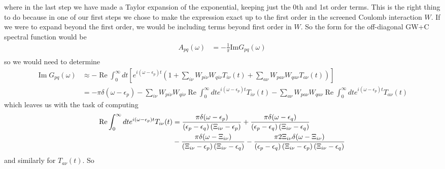 where in the last step we have made a Taylor expansion of the exponential, keeping just the 0th and 1st order terms. This is the right thing to do because in one of our first steps we chose to make the expression exact up to the first order in the screened Coulomb interaction $W$. If we were to expand beyond the first order, we would be including terms beyond first order in $W$.
So the form for the off-diagonal GW+C spectral function would be
\begin{align}
    A_{pq}(\omega) &= -\frac{1}{\pi} \text{Im} G_{pq}(\omega) \\
\end{align}
so we would need to determine
\begin{align}
   \operatorname{Im}G_{pq}(\omega) &\approx - \operatorname{Re}\int_0^\infty dt \left[e^{i(\omega - \epsilon_p) t} \left(1 + \sum_{i\nu} W_{p i \nu} W_{q i \nu} T_{i\nu}(t) + \sum_{a\nu} W_{p a \nu} W_{q a \nu} T_{a\nu}(t) \right) \right] \\
&= - \pi \delta(\omega - \epsilon_p) - \sum_{i\nu} W_{p i \nu} W_{q i \nu} \operatorname{Re}\int_0^\infty dt e^{i(\omega - \epsilon_p) t} T_{i\nu}(t) - \sum_{a\nu} W_{p a \nu} W_{q a \nu} \operatorname{Re}\int_0^\infty dt e^{i(\omega - \epsilon_p) t} T_{a\nu}(t)
\end{align}
which leaves us with the task of computing
\begin{align}
    \operatorname{Re}\int_0^\infty dt e^{i(\omega - \epsilon_p) t} T_{i\nu}(t) &= \frac{\pi\delta(\omega - \epsilon_p)}{\left(\epsilon_p-\epsilon_q\right)\left(\Xi_{i\nu}-\epsilon_p\right)} + \frac{\pi\delta(\omega - \epsilon_q)}{\left(\epsilon_p-\epsilon_q\right)\left(\Xi_{i\nu}-\epsilon_q\right)}\\
&  - \frac{\pi\delta(\omega - \Xi_{i\nu})}{\left(\Xi_{i\nu}-\epsilon_p\right)\left(\Xi_{i\nu}-\epsilon_q\right)}-\frac{\pi2\Xi_{i\nu}\delta(\omega - \Xi_{i\nu})}{\left(\epsilon_p-\epsilon_q\right)\left(\Xi_{i\nu}-\epsilon_p\right)\left(\Xi_{i\nu}-\epsilon_q\right)} \notag \\
\end{align}
and similarly for $T_{a\nu}(t)$. So
